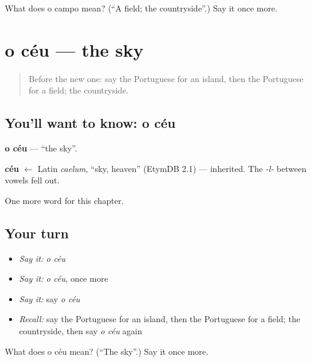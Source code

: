 \begin{tcolorbox}[breakable,colback=teal!4,colframe=teal!35!black,title={Before you move on}]
What does o campo mean? (\textquotedblleft{}A field; the countryside\textquotedblright{}.) Say it once more.
\end{tcolorbox}
\section[o céu]{o céu — the sky}

\label{lesson:PT-C58-ceu}



\begin{quote}
Before the new one: say the Portuguese for an island, then the Portuguese for a field; the countryside.
\end{quote}

\subsection*{You'll want to know: o céu}
\textbf{o céu} — \textquotedblleft{}the sky\textquotedblright{}.

\begin{cousinweb}
\textbf{céu} $\leftarrow$ Latin \emph{caelum}, \textquotedblleft{}sky, heaven\textquotedblright{} (EtymDB 2.1) — inherited. The \emph{-l-} between vowels fell out.
\end{cousinweb}

\begin{grammarlens}[title={What you've built}]
One more word for this chapter.
\end{grammarlens}

\subsection*{Your turn}
\begin{itemize}
\raggedright
  \item \emph{Say it:} \emph{o céu}
  \item \emph{Say it:} \emph{o céu}, once more
  \item \emph{Say it:} say \emph{o céu}
  \item \emph{Recall:} say the Portuguese for an island, then the Portuguese for a field; the countryside, then say \emph{o céu} again
\end{itemize}

\begin{tcolorbox}[breakable,colback=teal!4,colframe=teal!35!black,title={Before you move on}]
What does o céu mean? (\textquotedblleft{}The sky\textquotedblright{}.) Say it once more.
\end{tcolorbox}
